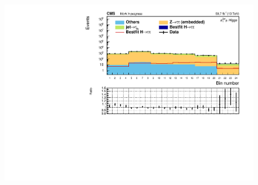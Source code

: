 \begin{figure}[!ht]
        \centering
        \includegraphics[scale=0.65]{Chapitre7/Images/histSigdataMC2018dp_postfit.pdf} 
        \vspace{0.5ex}
    \caption{}
    \label{SIGcategorydp}
\end{figure}


